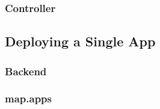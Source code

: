 \subsubsection{Controller} 
\label{subsubsec:Controller}



\subsection{Deploying a Single App}
\label{subsec:SingleAppDep}

\subsubsection{Backend} 
\label{subsubsec:Backend}

\subsubsection{map.apps} 
\label{subsubsec:mapapps}
